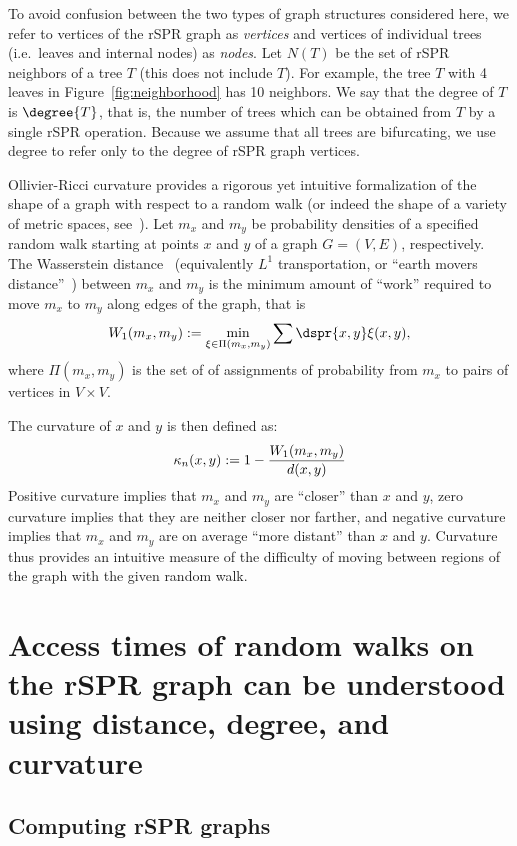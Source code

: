\documentclass[11pt,onecolumn,conference]{IEEEtran}
\newcommand{\curvature}[2][]{%
    \ifthenelse{\equal{#1}{}}%
		{\kappa_n(#2)}%
		{\kappa_n(#1;#2)}%
}
\begin{document}
To avoid confusion between the two types of graph structures considered here, we refer to vertices of the rSPR graph as \emph{vertices} and vertices of individual trees (i.e.\ leaves and internal nodes) as \emph{nodes}.
Let $N(T)$ be the set of rSPR neighbors of a tree $T$ (this does not include $T$).
For example, the tree $T$ with 4 leaves in Figure~\ref{fig:neighborhood} has 10 neighbors.
We say that the degree of $T$ is $\degree{T}$, that is, the number of trees which can be obtained from $T$ by a single rSPR operation.
Because we assume that all trees are bifurcating, we use degree to refer only to the degree of rSPR graph vertices.

Ollivier-Ricci curvature provides a rigorous yet intuitive formalization of the shape of a graph with respect to a random walk (or indeed the shape of a variety of metric spaces, see~\cite{Ollivier2009-bw}).
Let $m_x$ and $m_y$ be probability densities of a specified random walk starting at points $x$ and $y$ of a graph $G = (V,E)$, respectively.
The Wasserstein distance~\cite{Villani2003-wv} (equivalently $L^1$ transportation, or ``earth movers distance''~\cite{rubner2000earth}) between $m_x$ and $m_y$ is the minimum amount of ``work'' required to move $m_x$ to $m_y$ along edges of the graph, that is
 $$ W_1(m_x, m_y) := \min_{\xi \in \Pi(m_x, m_y)} \sum \dspr{x,y} \xi(x,y),$$
where $\Pi(m_x, m_y)$ is the set of of assignments of probability from $m_x$ to pairs of vertices in $V \times V$.

The curvature of $x$ and $y$ is then defined as:
\begin{equation}
\curvature{x, y} := 1 - \frac{W_1(m_x, m_y)}{d(x, y)}
\label{eq:curvatureDef}
\end{equation}
Positive curvature implies that $m_x$ and $m_y$ are ``closer'' than $x$ and $y$, zero curvature implies that they are neither closer nor farther, and negative curvature implies that $m_x$ and $m_y$ are on average ``more distant'' than $x$ and $y$.
Curvature thus provides an intuitive measure of the difficulty of moving between regions of the graph with the given random walk.


\section{Access times of random walks on the rSPR graph can be understood using distance, degree, and curvature}

\subsection{Computing rSPR graphs}
\label{sec:computing_treespace}
\end{document}
